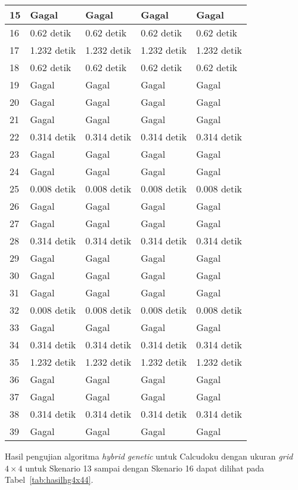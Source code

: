 \begin{table}
\begin{tabular}{| l | l | l | l | l |}
\hline
15 & Gagal & Gagal & Gagal & Gagal \\
\hline
16 & 0.62 detik & 0.62 detik & 0.62 detik & 0.62 detik \\
\hline
17 & 1.232 detik & 1.232 detik & 1.232 detik & 1.232 detik \\
\hline
18 & 0.62 detik & 0.62 detik & 0.62 detik & 0.62 detik \\
\hline
19 & Gagal & Gagal & Gagal & Gagal \\
\hline
20 & Gagal & Gagal & Gagal & Gagal \\
\hline
21 & Gagal & Gagal & Gagal & Gagal \\
\hline
22 & 0.314 detik & 0.314 detik & 0.314 detik & 0.314 detik \\
\hline
23 & Gagal & Gagal & Gagal & Gagal \\
\hline
24 & Gagal & Gagal & Gagal & Gagal \\
\hline
25 & 0.008 detik & 0.008 detik & 0.008 detik & 0.008 detik \\
\hline
26 & Gagal & Gagal & Gagal & Gagal \\
\hline
27 & Gagal & Gagal & Gagal & Gagal \\
\hline
28 & 0.314 detik & 0.314 detik & 0.314 detik & 0.314 detik \\
\hline
29 & Gagal & Gagal & Gagal & Gagal \\
\hline
30 & Gagal & Gagal & Gagal & Gagal \\
\hline
31 & Gagal & Gagal & Gagal & Gagal \\
\hline
32 & 0.008 detik & 0.008 detik & 0.008 detik & 0.008 detik \\
\hline
33 & Gagal & Gagal & Gagal & Gagal \\
\hline
34 & 0.314 detik & 0.314 detik & 0.314 detik & 0.314 detik \\
\hline
35 & 1.232 detik & 1.232 detik & 1.232 detik & 1.232 detik \\
\hline
36 & Gagal & Gagal & Gagal & Gagal \\
\hline
37 & Gagal & Gagal & Gagal & Gagal \\
\hline
38 & 0.314 detik & 0.314 detik & 0.314 detik & 0.314 detik \\
\hline
39 & Gagal & Gagal & Gagal & Gagal \\
\hline
\end{tabular}
\label{tab:hasilhg4x43}
\end{table}

Hasil pengujian algoritma \textit{hybrid genetic} untuk Calcudoku dengan ukuran \textit{grid} \begin{math}4 \times 4\end{math} untuk Skenario 13 sampai dengan Skenario 16 dapat dilihat pada Tabel~\ref{tab:hasilhg4x44}.

